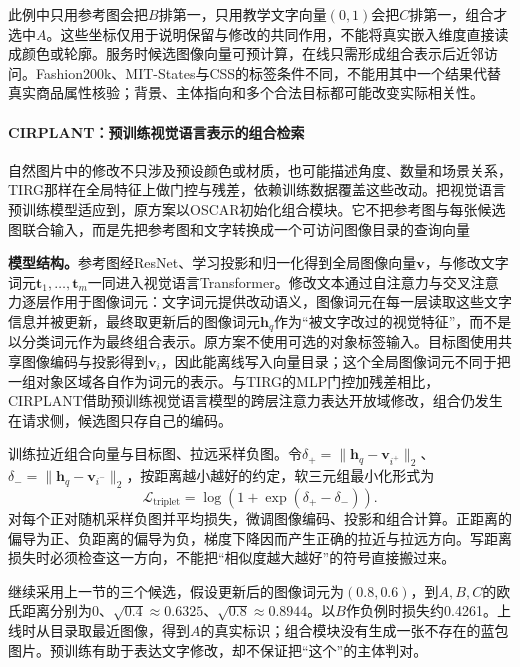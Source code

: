此例中只用参考图会把$B$排第一，只用教学文字向量$(0,1)$会把$C$排第一，组合才选中$A$。这些坐标仅用于说明保留与修改的共同作用，不能将真实嵌入维度直接读成颜色或轮廓。服务时候选图像向量可预计算，在线只需形成组合表示后近邻访问。Fashion200k、MIT-States与CSS的标签条件不同，不能用其中一个结果代替真实商品属性核验；背景、主体指向和多个合法目标都可能改变实际相关性。

\Needspace{100mm}
\paragraph{CIRPLANT：预训练视觉语言表示的组合检索}
\label{sec:rs-search-cirplant}

自然图片中的修改不只涉及预设颜色或材质，也可能描述角度、数量和场景关系，TIRG那样在全局特征上做门控与残差，依赖训练数据覆盖这些改动。把视觉语言预训练模型适应到，原方案以OSCAR初始化组合模块。它不把参考图与每张候选图联合输入，而是先把参考图和文字转换成一个可访问图像目录的查询向量

\textbf{模型结构。}参考图经ResNet、学习投影和归一化得到全局图像向量$\bm v$，与修改文字词元$\bm t_1,\ldots,\bm t_m$一同进入视觉语言Transformer。修改文本通过自注意力与交叉注意力逐层作用于图像词元：文字词元提供改动语义，图像词元在每一层读取这些文字信息并被更新，最终取更新后的图像词元$\bm h_q$作为“被文字改过的视觉特征”，而不是以分类词元作为最终组合表示。原方案不使用可选的对象标签输入。目标图使用共享图像编码与投影得到$\bm v_i$，因此能离线写入向量目录；这个全局图像词元不同于把一组对象区域各自作为词元的表示。与TIRG的MLP门控加残差相比，CIRPLANT借助预训练视觉语言模型的跨层注意力表达开放域修改，组合仍发生在请求侧，候选图只存自己的编码。

训练拉近组合向量与目标图、拉远采样负图。令$\delta_+=\|\bm h_q-\bm v_{i^+}\|_2$、$\delta_-=\|\bm h_q-\bm v_{i^-}\|_2$，按距离越小越好的约定，软三元组最小化形式为
\begin{equation}
 \mathcal L_{\mathrm{triplet}}=\log(1+\exp(\delta_+-\delta_-)).
 \label{eq:rs-search-cirplant-objective}
\end{equation}
对每个正对随机采样负图并平均损失，微调图像编码、投影和组合计算。正距离的偏导为正、负距离的偏导为负，梯度下降因而产生正确的拉近与拉远方向。写距离损失时必须检查这一方向，不能把“相似度越大越好”的符号直接搬过来。

继续采用上一节的三个候选，假设更新后的图像词元为$(0.8,0.6)$，到$A,B,C$的欧氏距离分别为0、$\sqrt{0.4}\approx0.6325$、$\sqrt{0.8}\approx0.8944$。以$B$作负例时损失约0.4261。上线时从目录取最近图像，得到$A$的真实标识；组合模块没有生成一张不存在的蓝包图片。预训练有助于表达文字修改，却不保证把“这个”的主体判对。

